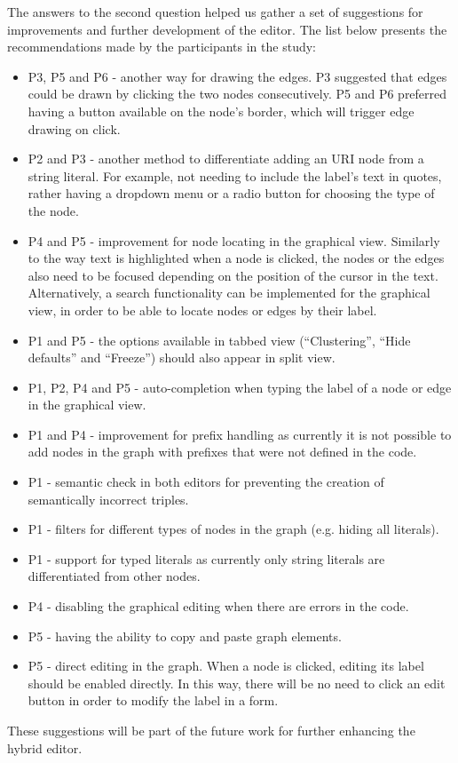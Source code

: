 The answers to the second question helped us gather a set of suggestions for improvements and further development of the editor. The list below presents the recommendations made by the participants in the study:

\begin{itemize}
	\item P3, P5 and P6 - another way for drawing the edges. P3 suggested that edges could be drawn by clicking the two nodes consecutively. P5 and P6 preferred having a button available on the node's border, which will trigger edge drawing on click.
	\item P2 and P3 - another method to differentiate adding an URI node from a string literal. For example, not needing to include the label's text in quotes, rather having a dropdown menu or a radio button for choosing the type of the node.
	\item P4 and P5 - improvement for node locating in the graphical view. Similarly to the way text is highlighted when a node is clicked, the nodes or the edges also need to be focused depending on the position of the cursor in the text. Alternatively, a search functionality can be implemented for the graphical view, in order to be able to locate nodes or edges by their label.
	\item P1 and P5 - the options available in tabbed view (``Clustering'', ``Hide defaults'' and ``Freeze'') should also appear in split view.
	\item P1, P2,  P4 and P5 - auto-completion when typing the label of a node or edge in the graphical view.
	\item P1 and P4 - improvement for prefix handling as currently it is not possible to add nodes in the graph with prefixes that were not defined in the code.
	\item P1 - semantic check in both editors for preventing the creation of semantically incorrect triples.
	\item P1 - filters for different types of nodes in the graph (e.g. hiding all literals).
	\item P1 - support for typed literals as currently only string literals are differentiated from other nodes.
	\item P4 - disabling the graphical editing when there are errors in the code.
	\item P5 - having the ability to copy and paste graph elements.
	\item P5 - direct editing in the graph. When a node is clicked, editing its label should be enabled directly. In this way, there will be no need to click an edit button in order to modify the label in a form.
\end{itemize}

These suggestions will be part of the future work for further enhancing the hybrid editor.








